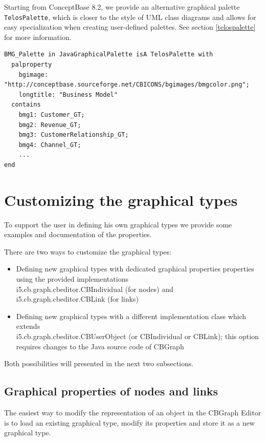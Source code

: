 Starting from ConceptBase 8.2, we provide an alternative graphical palette
{\tt TelosPalette}, which is closer to the style of UML class diagrams
and allows for easy specialization when creating user-defined palettes.
See section \ref{telospalette} for more information.


{\small
\begin{verbatim}
BMG_Palette in JavaGraphicalPalette isA TelosPalette with
  palproperty
    bgimage: "http://conceptbase.sourceforge.net/CBICONS/bgimages/bmgcolor.png"; 
    longtitle: "Business Model"
  contains
    bmg1: Customer_GT;
    bmg2: Revenue_GT;
    bmg3: CustomerRelationship_GT;
    bmg4: Channel_GT;
    ...
end
\end{verbatim}
}







\section{Customizing the graphical types}
\label{GTsCust}

To support the user in defining his own graphical
types we provide some examples and documentation
of the properties.

There are two ways to customize the graphical types:
\begin{itemize}
\item Defining new graphical types with dedicated graphical properties
properties using the provided implementations\\ i5.cb.graph.cbeditor.CBIndividual  (for nodes)
and i5.cb.graph.cbeditor.CBLink (for links)
\item Defining new graphical types with a different
implementation class which extends\\ i5.cb.graph.cbeditor.CBUserObject
(or CBIndividual or CBLink); this option requires changes to the Java source code
of CBGraph
\end{itemize}

Both possibilities will presented in the next two
subsections.

\subsection{Graphical properties of nodes and links}
\label{sec:graph-props}

The easiest way to modify the representation of an object
in the CBGraph Editor is to load an existing graphical type,
modify its properties and store it as a new graphical type.

